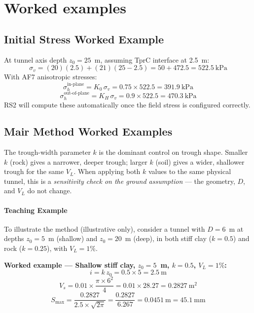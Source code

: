 \section{Worked examples}
\label{sec:worked-examples}

\subsection{Initial Stress Worked Example}
\label{sec:initial-stress-example}
At tunnel axis depth $z_0 = 25$~m, assuming TprC interface at 2.5~m:
\[
\sigma_v = (20)(2.5) + (21)(25 - 2.5) = 50 + 472.5 = 522.5\ \text{kPa}
\]
With AF7 anisotropic stresses:
\[
\sigma_h^{\text{in-plane}} = K_0 \, \sigma_v = 0.75 \times 522.5 = 391.9\ \text{kPa}
\]
\[
\sigma_h^{\text{out-of-plane}} = K_H \, \sigma_v = 0.9 \times 522.5 = 470.3\ \text{kPa}
\]
RS2 will compute these automatically once the field stress is configured correctly.

\subsection{Mair Method Worked Examples}
\label{sec:mair-examples}

\begin{notebox}[Sensitivity of $k$]
The trough-width parameter $k$ is the dominant control on trough shape. Smaller $k$ (rock) gives a narrower, deeper trough; larger $k$ (soil) gives a wider, shallower trough for the same $V_L$. When applying both $k$ values to the same physical tunnel, this is a \emph{sensitivity check on the ground assumption} --- the geometry, $D$, and $V_L$ do not change.
\end{notebox}

\paragraph{Teaching Example}
To illustrate the method (illustrative only), consider a tunnel with $D = 6$~m at depths $z_0 = 5$~m (shallow) and $z_0 = 20$~m (deep), in both stiff clay ($k = 0.5$) and rock ($k = 0.25$), with $V_L = 1\%$.

\textbf{Worked example --- Shallow stiff clay, $z_0 = 5$~m, $k=0.5$, $V_L = 1\%$:}
\[
i = k \, z_0 = 0.5 \times 5 = 2.5\ \text{m}
\]
\[
V_s = 0.01 \times \frac{\pi \times 6^2}{4} = 0.01 \times 28.27 = 0.2827\ \text{m}^2
\]
\[
S_{\text{max}} = \frac{0.2827}{2.5 \times \sqrt{2\pi}} = \frac{0.2827}{6.267} = 0.0451\ \text{m} = 45.1\ \text{mm}
\]

